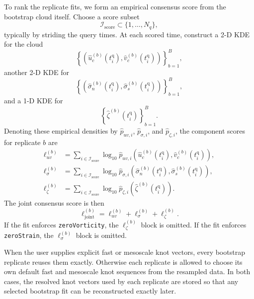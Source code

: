 \documentclass{article}
\begin{document}
To rank the replicate fits, we form an empirical consensus score from the
bootstrap cloud itself. Choose a score subset
\begin{equation}
\mathcal{I}_{\mathrm{score}} \subset \{1,\dots,N_q\},
\end{equation}
typically by striding the query times. At each scored time, construct a
2-D KDE for the cloud
\begin{equation}
\left\{
\left(\hat{u}_c^{(b)}(t_i^{\mathrm{q}}), \hat{v}_c^{(b)}(t_i^{\mathrm{q}})\right)
\right\}_{b=1}^{B},
\end{equation}
another 2-D KDE for
\begin{equation}
\left\{
\left(\hat{\sigma}_n^{(b)}(t_i^{\mathrm{q}}), \hat{\sigma}_s^{(b)}(t_i^{\mathrm{q}})\right)
\right\}_{b=1}^{B},
\end{equation}
and a 1-D KDE for
\begin{equation}
\left\{
\hat{\zeta}^{(b)}(t_i^{\mathrm{q}})
\right\}_{b=1}^{B}.
\end{equation}
Denoting these empirical densities by
$\hat{p}_{uv,i}$, $\hat{p}_{\sigma,i}$, and $\hat{p}_{\zeta,i}$, the
component scores for replicate $b$ are
\begin{align}
\ell_{uv}^{(b)}
&=
\sum_{i \in \mathcal{I}_{\mathrm{score}}}
\log_{10}
\hat{p}_{uv,i}
\!\left(
\hat{u}_c^{(b)}(t_i^{\mathrm{q}}),
\hat{v}_c^{(b)}(t_i^{\mathrm{q}})
\right),
\\
\ell_{\sigma}^{(b)}
&=
\sum_{i \in \mathcal{I}_{\mathrm{score}}}
\log_{10}
\hat{p}_{\sigma,i}
\!\left(
\hat{\sigma}_n^{(b)}(t_i^{\mathrm{q}}),
\hat{\sigma}_s^{(b)}(t_i^{\mathrm{q}})
\right),
\\
\ell_{\zeta}^{(b)}
&=
\sum_{i \in \mathcal{I}_{\mathrm{score}}}
\log_{10}
\hat{p}_{\zeta,i}
\!\left(
\hat{\zeta}^{(b)}(t_i^{\mathrm{q}})
\right).
\end{align}
The joint consensus score is then
\begin{equation}
\ell_{\mathrm{joint}}^{(b)}
=
\ell_{uv}^{(b)}
+
\ell_{\sigma}^{(b)}
+
\ell_{\zeta}^{(b)}.
\end{equation}
If the fit enforces \texttt{zeroVorticity}, the $\ell_{\zeta}^{(b)}$
block is omitted. If the fit enforces \texttt{zeroStrain}, the
$\ell_{\sigma}^{(b)}$ block is omitted.

When the user supplies explicit fast or mesoscale knot vectors, every
bootstrap replicate reuses them exactly. Otherwise each replicate is
allowed to choose its own default fast and mesoscale knot sequences from
the resampled data. In both cases, the resolved knot vectors used by each
replicate are stored so that any selected bootstrap fit can be
reconstructed exactly later.
\end{document}
